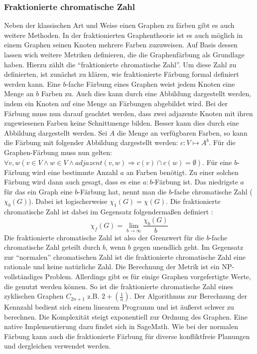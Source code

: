 \documentclass[a4paper,12pt,ngerman,chapterprefix=false,listof=totoc,bibliography=totoc]{scrreprt}
\begin{document}
\subsubsection*{Fraktionierte chromatische Zahl}
{
Neben der klassischen Art und Weise einen Graphen zu färben gibt es auch weitere Methoden. In der fraktionierten Graphentheorie ist es auch möglich in einem Graphen seinen Knoten mehrere Farben zuzuweisen. Auf Basis dessen lassen wich weitere Metriken definieren, die die Graphenfärbung als Grundlage haben. Hierzu zählt die "`fraktionierte chromatische Zahl"'. Um diese Zahl zu definierten, ist zunächst zu klären, wie fraktionierte Färbung formal definiert werden kann. Eine \(b\)-fache Färbung eines Graphen weist jedem Knoten eine Menge an \(b\) Farben zu. Auch dies kann durch eine Abbildung dargestellt werden, indem ein Knoten auf eine Menge an Färbungen abgebildet wird. Bei der Färbung muss nun darauf geachtet werden, dass zwei adjazente Knoten mit ihren zugewiesenen Farben keine Schnittmenge bilden. Besser kann dies durch eine Abbildung dargestellt werden. Sei \(A\) die Menge an verfügbaren Farben, so kann die Färbung mit folgender Abbildung dargestellt werden: \(c: V\mapsto A^b\). Für die Graphen-Färbung muss nun gelten: \(\forall v,w(v\in V\land w\in V\land adjazent(v,w)\Rightarrow c(v)\cap c(w)=\emptyset)\). Für eine \(b\)-Färbung wird eine bestimmte Anzahl \(a\) an Farben benötigt. Zu einer solchen Färbung wird dann auch gesagt, dass es eine \(a:b\)-Färbung ist. Das niedrigste \(a\) für das ein Graph eine \(b\)-Färbung hat, nennt man die \(b\)-fache chromatische Zahl (\(\chi _b(G)\)). Dabei ist logischerweise \(\chi_1(G) = \chi (G)\). Die fraktionierte chromatische Zahl ist dabei im Gegensatz folgendermaßen definiert \cite{scheinerman_fractional_2011}:
\[\chi_f(G)=\lim_{b\to\infty}\frac{\chi_b(G)}{b}\]
Die fraktionierte chromatische Zahl ist also der Grenzwert für die \(b\)-fache chromatische Zahl geteilt durch \(b\), wenn \(b\) gegen unendlich geht. Im Gegensatz zur "`normalen"' chromatischen Zahl ist die fraktionierte chromatische Zahl eine rationale und keine natürliche Zahl. Die Berechnung der Metrik ist ein NP-vollständiges Problem. Allerdings gibt es für einige Graphen vorgefertigte Werte, die genutzt werden können. So ist die fraktionierte chromatische Zahl eines zyklischen Graphen \(C_{2n+1}\) z.B. \(2+(\frac{1}{n})\). Der Algorithmus zur Berechnung der Kennzahl bedient sich einem linearem Programm und ist äußerst schwer zu berechnen. Die Komplexität steigt exponentiell zur Ordnung des Graphen. Eine native Implementierung dazu findet sich in SageMath. Wie bei der normalen Färbung kann auch die fraktionierte Färbung für diverse konfliktfreie Planungen und dergleichen verwendet werden. \cite{weisstein_chromatic_nodate,sagemath_graph_2020-1,scheinerman_fractional_2011}
}
\end{document}
